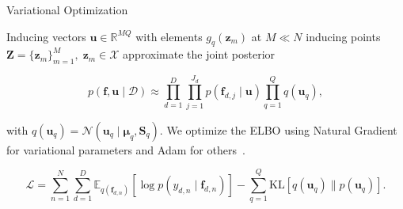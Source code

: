\begin{frame}{Variational Optimization}

	\begin{block}{}
		Inducing vectors \( \mathbf{u} \in \mathbb{R}^{MQ} \) with elements \( g_q(\mathbf{z}_m) \) at 
		\( M \ll N \) inducing points \( \mathbf{Z}=\{\mathbf{z}_m\}_{m=1}^M, \;\mathbf{z}_m \in \mathcal{X} \) approximate the joint posterior
	\end{block}
	
	\[
	p(\mathbf{f},\mathbf{u}\mid \mathcal{D}) 
	\approx \prod_{d=1}^D \prod_{j=1}^{J_d} p(\mathbf{f}_{d,j}\mid \mathbf{u})
	\prod_{q=1}^Q q(\mathbf{u}_q),
	\]
	
	\begin{block}{}
		with \( q(\mathbf{u}_q)=\mathcal{N}(\mathbf{u}_q\mid \boldsymbol{\mu}_q,\mathbf{S}_q) \).
		We optimize the ELBO using  Natural Gradient for variational parameters and Adam for others~\cite{pmlr-v84-salimbeni18a}.
	\end{block}
	
	\[
	\mathcal{L} = \sum_{n=1}^{N}\sum_{d=1}^{D}
	\mathbb{E}_{q(\mathbf{f}_{d,n})}\!\left[\log p(y_{d,n}\mid \mathbf{f}_{d,n})\right]
	- \sum_{q=1}^{Q}\mathrm{KL}\!\left[q(\mathbf{u}_q)\parallel p(\mathbf{u}_q)\right].
	\]

\end{frame}
